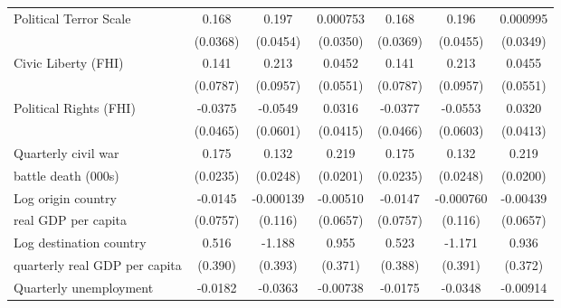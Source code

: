 \begin{table}[htbp]
\begin{tabular}{l*{6}{c}}
\hline
Political Terror Scale&       0.168\sym{***}&       0.197\sym{***}&    0.000753         &       0.168\sym{***}&       0.196\sym{***}&    0.000995         \\
                    &    (0.0368)         &    (0.0454)         &    (0.0350)         &    (0.0369)         &    (0.0455)         &    (0.0349)         \\
[0,5em]
Civic Liberty (FHI) &       0.141         &       0.213\sym{*}  &      0.0452         &       0.141         &       0.213\sym{*}  &      0.0455         \\
                    &    (0.0787)         &    (0.0957)         &    (0.0551)         &    (0.0787)         &    (0.0957)         &    (0.0551)         \\
[0,5em]
Political Rights (FHI)&     -0.0375         &     -0.0549         &      0.0316         &     -0.0377         &     -0.0553         &      0.0320         \\
                    &    (0.0465)         &    (0.0601)         &    (0.0415)         &    (0.0466)         &    (0.0603)         &    (0.0413)         \\
[0,5em]
Quarterly civil war &       0.175\sym{***}&       0.132\sym{***}&       0.219\sym{***}&       0.175\sym{***}&       0.132\sym{***}&       0.219\sym{***}\\
battle death (000s)                    &    (0.0235)         &    (0.0248)         &    (0.0201)         &    (0.0235)         &    (0.0248)         &    (0.0200)         \\
[0,5em]
Log origin country &     -0.0145         &   -0.000139         &    -0.00510         &     -0.0147         &   -0.000760         &    -0.00439         \\
real GDP per capita                    &    (0.0757)         &     (0.116)         &    (0.0657)         &    (0.0757)         &     (0.116)         &    (0.0657)         \\
[0,5em]
Log destination country&       0.516         &      -1.188\sym{**} &       0.955\sym{*}  &       0.523         &      -1.171\sym{**} &       0.936\sym{*}  \\
 quarterly real GDP per capita                    &     (0.390)         &     (0.393)         &     (0.371)         &     (0.388)         &     (0.391)         &     (0.372)         \\
[0,5em]
Quarterly unemployment&     -0.0182\sym{**} &     -0.0363\sym{***}&    -0.00738         &     -0.0175\sym{**} &     -0.0348\sym{***}&    -0.00914         \\

\end{tabular}
\end{table}
